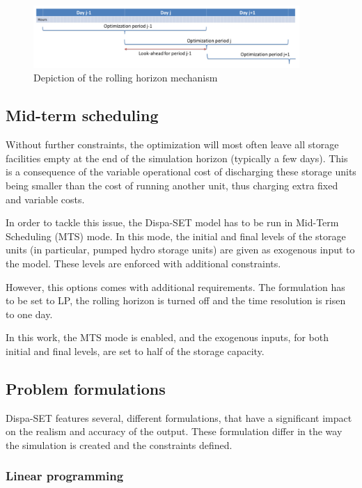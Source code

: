 \begin{figure}[h]
    \centering
    \includegraphics[width=0.9\textwidth]{resources/images/rolling_horizon.png}
    \caption{Depiction of the rolling horizon mechanism}
    \label{fig:rolling-horizon}
\end{figure}

\subsection{Mid-term scheduling}

Without further constraints, the optimization will most often leave all storage facilities empty at the end of the simulation horizon (typically a few days). This is a consequence of the variable operational cost of discharging these storage units being smaller than the cost of running another unit, thus charging extra fixed and variable costs.

In order to tackle this issue, the Dispa-SET model has to be run in Mid-Term Scheduling (MTS) mode. In this mode, the initial and final levels of the storage units (in particular, pumped hydro storage units) are given as exogenous input to the model. These levels are enforced with additional constraints.

However, this options comes with additional requirements. The formulation has to be set to LP, the rolling horizon is turned off and the time resolution is risen to one day.

In this work, the MTS mode is enabled, and the exogenous inputs, for both initial and final levels, are set to half of the storage capacity.

\subsection{Problem formulations}

Dispa-SET features several, different formulations, that have a significant impact on the realism and accuracy of the output. These formulation differ in the way the simulation is created and the constraints defined.

\subsubsection{Linear programming}

